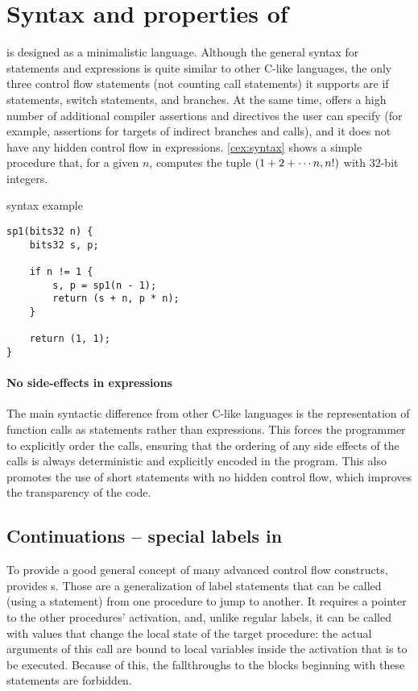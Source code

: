 \section{Syntax and properties of \cmm}

\cmm is designed as a minimalistic language. Although the general syntax for statements and expressions is quite similar to other C-like languages, the only three control flow statements (not counting call statements) it supports are if statements, switch statements, and branches. At the same time, \cmm offers a high number of additional compiler assertions and directives the user can specify (for example, assertions for targets of indirect branches and calls), and it does not have any hidden control flow in expressions. \cref{cex:syntax} shows a simple procedure  that, for a given $n$, computes the tuple $\left(1 + 2 + \cdots n, n!\right)$ with 32-bit integers.

\begin{codex}
    \caption{\cmm syntax example}
    \label{cex:syntax}

    \begin{lstlisting}
sp1(bits32 n) {
    bits32 s, p;

    if n != 1 {
        s, p = sp1(n - 1);
        return (s + n, p * n);
    }

    return (1, 1);
}
    \end{lstlisting}
\end{codex}

\paragraph{No side-effects in expressions}

The main syntactic difference from other C-like languages is the representation of function calls as statements rather than expressions. This forces the programmer to explicitly order the calls, ensuring that the ordering of any side effects of the calls is always deterministic and explicitly encoded in the program. This also promotes the use of short statements with no hidden control flow, which improves the transparency of the code.

\subsection{Continuations -- special labels in \cmm}

To provide a good general concept of many advanced control flow constructs, \cmm provides s. Those are a generalization of label statements that can be called (using a  statement) from one procedure to jump to another. It requires a pointer to the other procedures' activation, and, unlike regular labels, it can be called with values that change the local state of the target procedure: the actual arguments of this  call are bound to local variables inside the activation that is to be executed. Because of this, the fallthroughs to the blocks beginning with these statements are forbidden.

